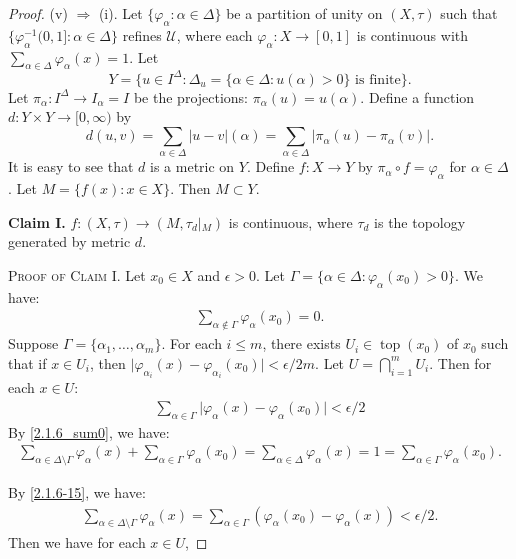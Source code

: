 \documentclass[main.tex]{subfiles}
\begin{document}
\begin{proof}
(v) $\Rightarrow$ (i).
Let $\{\varphi_\alpha: \alpha \in \Delta\}$ be a partition of unity on $(X, \tau)$ 
such that $\{\varphi_\alpha^{-1}(0, 1]: \alpha \in \Delta\}$ refines $\mathscr{U}$, 
where each $\varphi_\alpha: X \rightarrow [0, 1]$ is 
continuous with $\sum_{\alpha \in \Delta} \varphi_\alpha(x) = 1$. 
Let
$$Y = \{u \in I^\Delta: \Delta_u = \{\alpha \in \Delta: u(\alpha) > 0\} \text{ is finite}\}.$$
Let $\pi_\alpha: I^\Delta \rightarrow I_\alpha = I$ be the projections: 
$\pi_\alpha(u) = u(\alpha)$. Define a function $d: Y \times Y \rightarrow [0, \infty)$ by
$$d(u, v) = \sum_{\alpha \in \Delta} \vert{}u - v\vert{}(\alpha) = \sum_{\alpha \in \Delta} \vert{}\pi_\alpha(u) - \pi_\alpha(v)\vert{}.$$
It is easy to see that $d$ is a metric on $Y$. Define $f: X \rightarrow Y$ 
by $\pi_\alpha \circ f = \varphi_\alpha$ for $\alpha \in \Delta$. 
Let $M = \{f(x): x \in X\}$. Then $M \subset Y$.


\noindent\textbf{Claim I.} $f: (X, \tau) \rightarrow (M, \tau_d\vert{}_M)$ is continuous, where $\tau_d$ is the topology generated by metric $d$.

\noindent\textsc{Proof of Claim I.} Let $x_0 \in X$ and $\epsilon > 0$. Let $\Gamma = \{\alpha \in \Delta: \varphi_\alpha(x_0) > 0\}$. We have:
\begin{gather}
	\sum_{\alpha \notin \Gamma} \varphi_\alpha(x_0) = 0.  \label{2.1.6_sum0}
\end{gather}
Suppose $\Gamma = \{\alpha_1, \dots, \alpha_m\}$. For each $i \le m$, there 
exists $U_i\in\operatorname{top}(x_0)$ of $x_0$ such that if $x \in U_i$, 
then $\vert{}\varphi_{\alpha_i}(x) - \varphi_{\alpha_i}(x_0)\vert{} < \epsilon / 2m$. 
Let $U = \bigcap_{i=1}^m U_i$. Then for each $x \in U$:
\begin{gather}
	\sum_{\alpha \in \Gamma} \vert{}\varphi_\alpha(x) - \varphi_\alpha(x_0)\vert{} < \epsilon / 2
\end{gather}
By \eqref{2.1.6_sum0}, we have:
\begin{gather}
	\sum_{\alpha \in\Delta\setminus \Gamma} \varphi_\alpha(x) + \sum_{\alpha \in \Gamma} \varphi_\alpha(x_0) = \sum_{\alpha \in \Delta} \varphi_\alpha(x) = 1 = \sum_{\alpha \in \Gamma} \varphi_\alpha(x_0).  \label{2.1.6-15}
\end{gather}

\noindent By \eqref{2.1.6-15}, we have:
\begin{gather}
\sum_{\alpha \in\Delta\setminus  \Gamma} \varphi_\alpha(x) = \sum_{\alpha \in \Gamma} (\varphi_\alpha(x_0) - \varphi_\alpha(x)) < \epsilon / 2.
\end{gather}
\noindent Then we have for each $x \in U$,


\end{proof}
\end{document}
